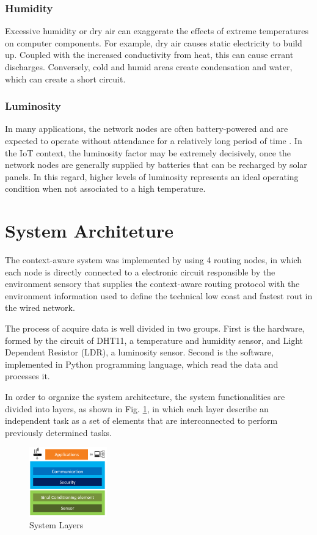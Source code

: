 \subsubsection{Humidity}
Excessive humidity or dry air can exaggerate the effects of extreme temperatures on computer components. For example, dry air causes static electricity to build up. Coupled with the increased conductivity from heat, this can cause errant discharges. Conversely, cold and humid areas create condensation and water, which can create a short circuit.

\subsubsection{Luminosity}
In many applications, the network nodes are often battery-powered and are expected to operate without attendance for a relatively long period of time \cite{Shio2010}. In the IoT context, the luminosity factor may be extremely decisively, once the network nodes are generally supplied by batteries that can be recharged by solar panels. In this regard, higher levels of luminosity represents an ideal operating condition when not associated to a high temperature.

\section{System Architeture}
The context-aware system was implemented by using 4 routing nodes, in which each node is directly connected to a electronic circuit responsible by the environment sensory that supplies the context-aware routing protocol with the environment information used to define the technical low coast and fastest rout in the wired network.

The process of acquire data is well divided in two groups. First is the hardware, formed by the circuit of DHT11, a temperature and humidity sensor, and Light Dependent Resistor (LDR), a luminosity sensor. Second is the software, implemented in Python programming language, which read the data and processes it.

In order to organize the system architecture, the system functionalities are divided into layers, as shown in Fig. \ref{System-Layers}, in which each layer describe an independent task as a set of elements that are interconnected to perform previously determined tasks.

 \begin{figure}[h]
 	\centering
 	\includegraphics[width=0.3\textwidth]{figs/system-layer.png}
 	\caption{System Layers}
 	\label{System-Layers}
 \end{figure}

